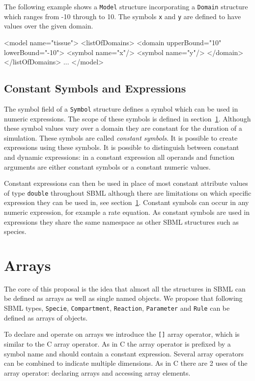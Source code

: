 \documentclass{cekarticle}
\begin{document}
The following example shows a \texttt{Model} structure
incorporating a \texttt{Domain} structure which ranges from -10
through to 10.  The symbols \texttt{x} and \texttt{y} are defined
to have values over the given domain.

\begin{example}
<model name="tissue">
    <listOfDomains>
        <domain upperBound="10" lowerBound="-10">
            <symbol name="x"/>
            <symbol name="y"/>
        </domain>
    </listOfDomains>
    ...
</model>
\end{example}

\subsection{Constant Symbols and Expressions}
\label{sec:constantExpressions}

The symbol field of a \texttt{Symbol} structure defines a symbol
which can be used in numeric expressions.  The scope of these
symbols is defined in section~\ref{sec:arrays}. Although these
symbol values vary over a domain they are constant for the
duration of a simulation.  These symbols are called
\emph{constant symbols}. It is possible to create expressions
using these symbols. It is possible to distinguish between
constant and dynamic expressions: in a constant expression all
operands and function arguments are either constant symbols or a
constant numeric values.

Constant expressions can then be used in place of most constant
attribute values of type \texttt{double} throughout SBML although
there are limitations on which specific expression they can be
used in, see section~\ref{sec:arrays}. Constant symbols can occur
in any numeric expression, for example a rate equation. As
constant symbols are used in expressions they share the same
namespace as other SBML structures such as species.

\section{Arrays}
\label{sec:arrays}

The core of this proposal is the idea that almost all the
structures in SBML can be defined as arrays as well as single
named objects.  We propose that following SBML types,
\texttt{Specie}, \texttt{Compartment}, \texttt{Reaction},
\texttt{Parameter} and \texttt{Rule} can be defined as arrays of
objects.

To declare and operate on arrays we introduce the \texttt{[]}
array operator, which is similar to the C array operator.  As in
C the array operator is prefixed by a symbol name and should
contain a constant expression.  Several array operators can be
combined to indicate multiple dimensions.   As in C there are 2
uses of the array operator: declaring arrays and accessing array
elements.
\end{document}
